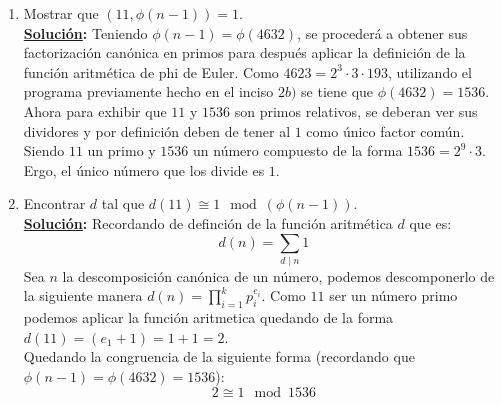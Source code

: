 \documentclass[11pt,letterpaper]{article}
\newcommand{\sol}{\textbf{\underline{Solución}: }} %
\begin{document}
\begin{enumerate}[label=\alph*)]
\item Mostrar que $(11, \phi (n - 1)) = 1$.\\
\sol Teniendo $\phi(n-1) = \phi(4632)$, se procederá a obtener sus factorización canónica en primos para después
aplicar la definición de la función aritmética de phi de Euler. Como $4623 = 2^3 \cdot 3 \cdot 193$, 
utilizando el programa previamente hecho en el inciso $2b)$ se tiene que $\phi(4632) = 1536$.\\
Ahora para exhibir que $11$ y $1536$ son primos relativos, se deberan ver sus dividores y por definición 
deben de tener al $1$ como único factor común. Siendo $11$ un primo y $1536$ un número compuesto de la 
forma $1536 = 2^9 \cdot 3$. Ergo, el único número que los divide es $1$.


\item Encontrar $d$ tal que $d(11) \cong 1 \mod{(\phi(n - 1))}$.\\
\sol Recordando de definción de la función aritmética $d$ que es:
$$d(n) = \sum_{d \mid n} 1$$
Sea $n$ la descomposición canónica de un número, podemos descomponerlo de la siguiente manera
$d(n) = \prod_{i=1}^{k} p_i^{e_i}$. Como $11$ ser un número primo podemos aplicar la función 
aritmetica quedando de la forma $d(11) = (e_1 +1) = 1+1 = 2$.\\
Quedando la congruencia de la siguiente forma (recordando que $\phi(n-1) = \phi(4632) = 1536$):
$$2 \cong 1 \mod{1536}$$


\end{enumerate}
\end{document}
